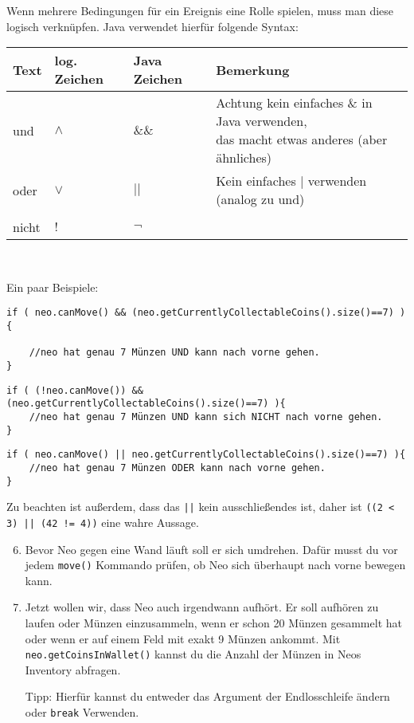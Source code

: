 \begin{Infobox}

	Wenn mehrere Bedingungen für ein Ereignis eine Rolle spielen, muss man diese logisch verknüpfen. 
	Java verwendet hierfür folgende Syntax:
	\begin{center}
		\begin{tabular}{ l | l | l | l}
			Text & log. Zeichen & Java Zeichen & Bemerkung \\ \hline
			und  & $\land$ & $\&\&$ & \minibox{
					Achtung kein einfaches \& in Java verwenden,\\ 
					das macht etwas anderes (aber ähnliches)
			} \\
			oder & $\lor$ & $||$ & Kein einfaches $|$ verwenden (analog zu und) \\
			& &  \\
			nicht & $!$ & $\neg$ &\\
		\end{tabular}\\
	\end{center}

	Ein paar Beispiele:

	\begin{lstlisting}[numbers=none]
if ( neo.canMove() && (neo.getCurrentlyCollectableCoins().size()==7) ){

	//neo hat genau 7 Münzen UND kann nach vorne gehen.
}
	\end{lstlisting}

	\begin{lstlisting}[numbers=none]
if ( (!neo.canMove()) && (neo.getCurrentlyCollectableCoins().size()==7) ){
	//neo hat genau 7 Münzen UND kann sich NICHT nach vorne gehen.
}
	\end{lstlisting}

	\begin{lstlisting}[numbers=none]
if ( neo.canMove() || neo.getCurrentlyCollectableCoins().size()==7) ){
	//neo hat genau 7 Münzen ODER kann nach vorne gehen.
}
	\end{lstlisting}

	Zu beachten ist außerdem, dass das  \lstinline{||} kein ausschließendes  ist, daher ist \lstinline{((2 < 3) || (42 != 4))} eine wahre Aussage.

\end{Infobox}


\begin{enumerate}\setcounter{enumi}{5}
	\item
		Bevor Neo gegen eine Wand läuft soll er sich umdrehen.
		Dafür musst du vor jedem \lstinline{move()} Kommando prüfen, ob Neo sich überhaupt nach vorne bewegen kann.

	\item
		Jetzt wollen wir, dass Neo auch irgendwann aufhört.
		Er soll aufhören zu laufen oder Münzen einzusammeln, wenn er schon 20 Münzen gesammelt hat oder wenn er auf einem Feld mit exakt 9 Münzen ankommt.
		Mit \lstinline{neo.getCoinsInWallet()} kannst du die Anzahl der Münzen in Neos Inventory abfragen.

		Tipp: Hierfür kannst du entweder das Argument der Endlosschleife ändern oder \lstinline{break} Verwenden.
\end{enumerate}
\newpage
